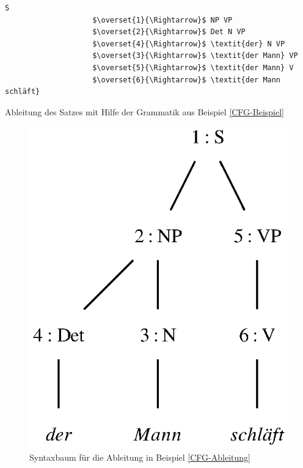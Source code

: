 \begin{program}[h]
\begin{Verbatim}[commandchars=\\\{\},codes={\catcode`$=3\catcode`^=7}] 
                    S
                    $\overset{1}{\Rightarrow}$ NP VP
                    $\overset{2}{\Rightarrow}$ Det N VP
                    $\overset{4}{\Rightarrow}$ \textit{der} N VP
                    $\overset{3}{\Rightarrow}$ \textit{der Mann} VP
                    $\overset{5}{\Rightarrow}$ \textit{der Mann} V
                    $\overset{6}{\Rightarrow}$ \textit{der Mann schläft}
\end{Verbatim}
\caption{Ableitung des Satzes mit Hilfe der Grammatik aus Beispiel \ref{CFG-Beispiel}}
\label{CFG-Ableitung}
\end{program}
\begin{figure}[h]
\includegraphics{graphics/MiniSatzSyntax.eps}
\caption{Syntaxbaum für die Ableitung in Beispiel \ref{CFG-Ableitung}}
\label{CFG-Syntaxbaum}
\end{figure}
